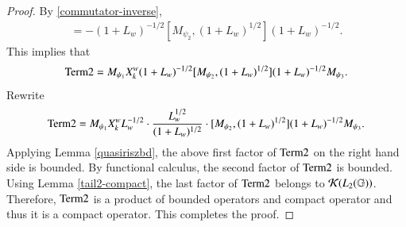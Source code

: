 \documentclass[leqno]{amsart}
\begin{document}
\begin{proof}
		By \eqref{commutator-inverse},
		\begin{align*}
			[M_{\psi_{2}},(1+L_{w})^{-1/2}]
			=-(1+L_{w})^{-1/2}[M_{\psi_{2}},(1+L_{w})^{1/2}](1+L_{w})^{-1/2}.
		\end{align*}
		This implies that
		\begin{align*}
			{\rm Term2}=M_{\psi_{1}}X_{k}^{w}(1+L_{w})^{-1/2}[M_{\psi_{2}},(1+L_{w})^{1/2}](1+L_{w})^{-1/2}M_{\psi_{3}}.
		\end{align*}
		Rewrite
		\begin{align*}
			{\rm Term2}=M_{\psi_{1}}X_{k}^{w}L_{w}^{-1/2}\cdot
			\frac{L_{w}^{1/2}}{(1+L_{w})^{1/2}}\cdot
			[M_{\psi_{2}},(1+L_{w})^{1/2}](1+L_{w})^{-1/2}M_{\psi_{3}}.
		\end{align*}
		Applying Lemma \ref{quasiriszbd}, the above first factor of ${\rm Term2}$ on the right hand side is bounded.
		By functional calculus, the second factor of ${\rm Term2}$ is bounded.
		Using Lemma \ref{tail2-compact}, the last factor of ${\rm Term2}$ belongs to ${\mathcal K}(L_{2}(\mathbb{G}))$.
		Therefore, ${\rm Term2}$ is a product of bounded operators and compact operator and thus it is a compact operator.
		This completes the proof.
	\end{proof}
	
\end{document}

